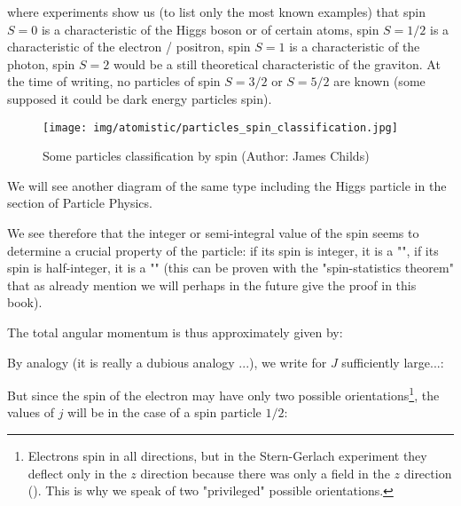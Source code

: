 	where experiments show us (to list only the most known examples) that spin $S=0$ is a characteristic of the Higgs boson or of certain atoms, spin $S=1/2$ is a characteristic of the electron / positron, spin $S=1$ is a characteristic of the photon, spin $S=2$ would be a still theoretical characteristic of the graviton. At the time of writing, no particles of spin $S=3/2$ or $S=5/2$ are known (some supposed it could be dark energy particles spin).
	\begin{figure}[H]
		\centering
		\texttt{[image: img/atomistic/particles\_spin\_classification.jpg]}	
		\caption{Some particles classification by spin (Author: James Childs)}
	\end{figure}
	We will see another diagram of the same type including the Higgs particle in the section of Particle Physics.
	
	We see therefore that the integer or semi-integral value of the spin seems to determine a crucial property of the particle: if its spin is integer, it is a "", if its spin is half-integer, it is a "" (this can be proven with the "spin-statistics theorem" that as already mention we will perhaps in the future give the proof in this book).
	
	The total angular momentum is thus approximately given by:
	
	By analogy (it is really a dubious analogy ...), we write for $J$ sufficiently large...:
	
	But since the spin of the electron may have only two possible orientations\footnote{Electrons spin in all directions, but in the Stern-Gerlach experiment they deflect only in the $z$ direction because there was only a field in the $z$ direction (). This is why we speak of two "privileged" possible orientations.}, the values of $j$ will be in the case of a spin particle $1/2$:
	
